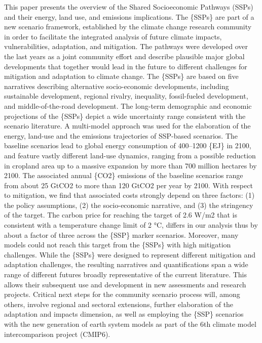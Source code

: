 This paper presents the overview of the Shared Socioeconomic Pathways (SSPs) and their energy, land use, and emissions implications. The \{SSPs\} are part of a new scenario framework, established by the climate change research community in order to facilitate the integrated analysis of future climate impacts, vulnerabilities, adaptation, and mitigation. The pathways were developed over the last years as a joint community effort and describe plausible major global developments that together would lead in the future to different challenges for mitigation and adaptation to climate change. The \{SSPs\} are based on five narratives describing alternative socio-economic developments, including sustainable development, regional rivalry, inequality, fossil-fueled development, and middle-of-the-road development. The long-term demographic and economic projections of the \{SSPs\} depict a wide uncertainty range consistent with the scenario literature. A multi-model approach was used for the elaboration of the energy, land-use and the emissions trajectories of SSP-based scenarios. The baseline scenarios lead to global energy consumption of 400–1200 \{EJ\} in 2100, and feature vastly different land-use dynamics, ranging from a possible reduction in cropland area up to a massive expansion by more than 700 million hectares by 2100. The associated annual \{CO2\} emissions of the baseline scenarios range from about 25 GtCO2 to more than 120 GtCO2 per year by 2100. With respect to mitigation, we find that associated costs strongly depend on three factors: (1) the policy assumptions, (2) the socio-economic narrative, and (3) the stringency of the target. The carbon price for reaching the target of 2.6 W/m2 that is consistent with a temperature change limit of 2 °C, differs in our analysis thus by about a factor of three across the \{SSP\} marker scenarios. Moreover, many models could not reach this target from the \{SSPs\} with high mitigation challenges. While the \{SSPs\} were designed to represent different mitigation and adaptation challenges, the resulting narratives and quantifications span a wide range of different futures broadly representative of the current literature. This allows their subsequent use and development in new assessments and research projects. Critical next steps for the community scenario process will, among others, involve regional and sectoral extensions, further elaboration of the adaptation and impacts dimension, as well as employing the \{SSP\} scenarios with the new generation of earth system models as part of the 6th climate model intercomparison project (CMIP6).